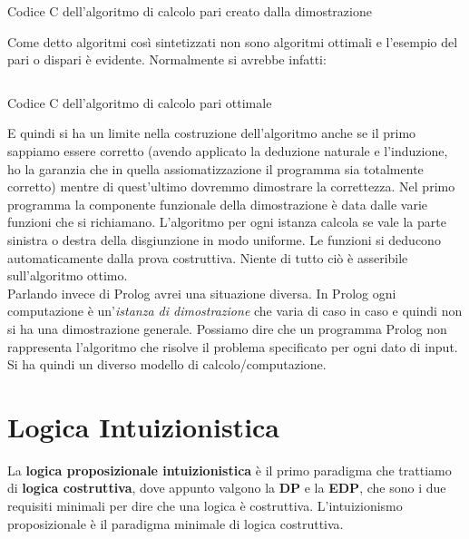 \documentclass[a4paper,12pt, oneside]{book}
\begin{document}
\begin{listing}
  \inputminted{c}{``code/pari.c''}
  \label{lst:pari}
  \caption{Codice C dell'algoritmo di calcolo pari creato dalla dimostrazione}
\end{listing}
Come detto algoritmi così sintetizzati non sono algoritmi ottimali e l'esempio
del pari o dispari è evidente. Normalmente si avrebbe infatti:
\begin{listing}[H]
  \inputminted{c}{``code/pariopt.c''}
  \label{lst:pari2}
  \caption{Codice C dell'algoritmo di calcolo pari ottimale}
\end{listing}
E quindi si ha un limite nella costruzione dell'algoritmo anche se il primo
sappiamo essere corretto (avendo applicato la deduzione naturale e l'induzione,
ho la garanzia che in quella assiomatizzazione il programma sia totalmente
corretto) mentre di quest'ultimo dovremmo dimostrare la correttezza. Nel primo
programma la componente funzionale della dimostrazione è data dalle varie
funzioni che si richiamano. L'algoritmo per ogni istanza calcola se vale la
parte sinistra o destra della disgiunzione in modo uniforme. Le funzioni si
deducono automaticamente dalla prova costruttiva. Niente di tutto ciò è
asseribile sull'algoritmo ottimo.\\ 
Parlando invece di Prolog avrei una situazione diversa. In Prolog ogni
computazione è un'\textit{istanza di dimostrazione} che varia di caso in caso e
quindi non si ha una dimostrazione generale. Possiamo dire che un programma
Prolog non rappresenta l'algoritmo che risolve il problema specificato per ogni
dato di input. Si ha quindi un diverso modello di calcolo/computazione.
\chapter{Logica Intuizionistica}
La \textbf{logica proposizionale intuizionistica} è il primo paradigma che
trattiamo di \textbf{logica costruttiva}, dove appunto valgono la \textbf{DP} e
la \textbf{EDP}, che sono i due requisiti minimali per dire che una logica è
costruttiva. L'intuizionismo proposizionale è il paradigma minimale di logica
costruttiva. 
\end{document}
